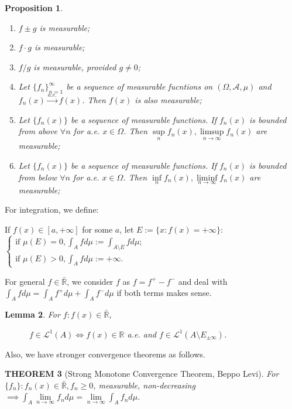 \documentclass[12pt]{article}
\theoremstyle{blueplain}
\newtheorem{theorem}{THEOREM}[section]
\newtheorem{proposition}[theorem]{Proposition}
\newtheorem{lemma}[theorem]{Lemma}
\theoremstyle{bluedef}
\theoremstyle{blueremark}
\newcommand{\R}{\mathbb{R}}
\numberwithin{equation}{section}
\begin{document}
\begin{proposition}
  \begin{enumerate}
    \item $f \pm g$ is measurable;
    \item $f \cdot g$ is measurable;
    \item $f / g$ is measurable, provided $g \neq 0$;
    \item Let $\{f_n\}_{n=1}^{\infty}$ be a sequence of measurable fucntions on $(\Omega, \mathcal{A}, \mu)$ and $f_n(x) \overset{a.e.}{\rightarrow} f(x)$. Then $f(x)$ is also measurable;
    \item Let $\{f_n(x)\}$ be a sequence of measurable functions. If $f_n(x)$ is bounded from above $\forall n$ for a.e. $x \in \Omega$. Then $\sup\limits_{n} f_n(x), \limsup\limits_{n \to \infty} f_n(x)$ are measurable;
    \item Let $\{f_n(x)\}$ be a sequence of measurable functions. If $f_n(x)$ is bounded from below $\forall n$ for a.e. $x \in \Omega$. Then $\inf\limits_{n} f_n(x), \liminf\limits_{n \to \infty} f_n(x)$ are measurable;
  \end{enumerate}
\end{proposition}

\noindent For integration, we define:

\noindent If $f(x) \in [a,+\infty]$ for some $a$, let $E := \{x: f(x)=+\infty\}$: $\begin{cases} \text{if } \mu(E) = 0, \int_A f d\mu := \int_{A \setminus E} f d\mu; \\ \text{if } \mu(E) > 0, \int_A f d\mu := +\infty. \end{cases}$

\noindent For general $f \in \bar{\R}$, we consider $f$ as $f = f^+ - f^-$ and deal with $\int_A f d\mu  = \int_A f^+ d\mu + \int_A f^- d\mu$ if both terms makes sense.

\begin{lemma}
  For $f:f(x) \in \bar{\R}$,

  $\quad \quad \quad f \in \mathcal{L}^1(A) \iff f(x) \in \R$ a.e. and $f \in \mathcal{L}^1(A \setminus E_{\pm \infty})$.
\end{lemma}

\noindent Also, we have stronger convergence theorems as follows.

\begin{theorem}[Strong Monotone Convergence Theorem, Beppo Levi]
  For $\{f_n\}: f_n(x) \in \bar{\R}, f_n \geq 0$, measurable, non-decreasing $\implies \int_A \lim\limits_{n \to \infty} f_n d\mu = \lim\limits_{n \to \infty} \int_A f_n d\mu$.
\end{theorem}
\end{document}
